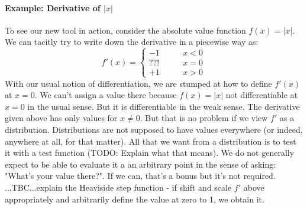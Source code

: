 




\paragraph{Example: Derivative of $|x|$}
To see our new tool in action, consider the absolute value function $f(x) = |x|$. We can tacitly try to write down the derivative in a piecewise way as:
\begin{equation}
f'(x) = 
 \begin{cases}
 -1  \qquad & x < 0 \\
 ??! \qquad & x = 0 \\
 +1  \qquad & x > 0
 \end{cases}
\end{equation}
With our usual notion of differentiation, we are stumped at how to define $f'(x)$ at $x = 0$. We can't assign a value there because $f(x) = |x|$ not differentiable at $x = 0$ in the usual sense. But it is differentiable in the weak sense. The derivative given above has only values for $x \neq 0$. But that is no problem if we view $f'$ as a distribution. Distributions are not supposed to have values everywhere (or indeed, anywhere at all, for that matter). All that we want from a distribution is to test it with a test function (TODO: Explain what that means). We do not generally expect to be able to evaluate it a an arbitrary point in the sense of asking: "What's your value there?". If we can, that's a bonus but it's not required. ...TBC...explain the Heaviside step function - if shift and scale $f'$ above appropriately and arbitrarily define the value at zero to 1, we obtain it.

